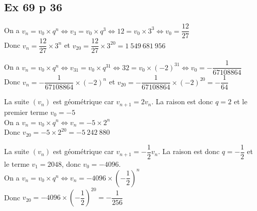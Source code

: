 \documentclass[a4paper,french]{book}
\begin{document}
\subsection*{Ex 69 p 36}
\begin{enumMet}
    \item On a $v_{n}=v_{0}\times q^{n}\iff v_3=v_0\times q^3 \iff 12=v_0\times 3^3 \iff v_0=\dfrac{12}{27}$\\
    Donc $v_{n}=\dfrac{12}{27}\times 3^{n}$ et $v_{20}=\dfrac{12}{27}\times3^{20}=1\ 549\ 681\ 956$
    \item On a $v_{n}=v_{0}\times q^{n}\iff v_{31}=v_0\times q^{31} \iff 32=v_0\times (-2)^{31} \iff v_0=-\dfrac{1}{67108864}$\\
    Donc $v_{n}=-\dfrac{1}{67108864}\times (-2)^{n}$ et $v_{20}=-\dfrac{1}{67108864}\times(-2)^{20}=-\dfrac{1}{64}$
    \item La suite $\left(v_{n}\right)$ est géométrique car $v_{n+1}=2 v_{n}$. La raison est donc $q=2$ et le premier terme $v_{0}=-5$\\
    On a $v_{n}=v_{0}\times q^{n}\iff v_{n}=-5\times 2^{n}$\\
    Donc $v_{20}=-5\times2^{20}=-5\ 242\ 880$
    \item La suite $\left(v_{n}\right)$ est géométrique car $v_{n+1}=-\dfrac{1}{2} v_{n}$. La raison est donc $q=-\dfrac{1}{2}$ et le terme $v_{1}=2048$, donc $v_0=-4096$.\\
    On a $v_{n}=v_{0}\times q^{n}\iff v_{n}=-4096\times \left(-\dfrac{1}{2}\right)^{n}$\\
    Donc $v_{20}=-4096\times \left(-\dfrac{1}{2}\right)^{20}=-\dfrac{1}{256}$
\end{enumMet}
\end{document}
